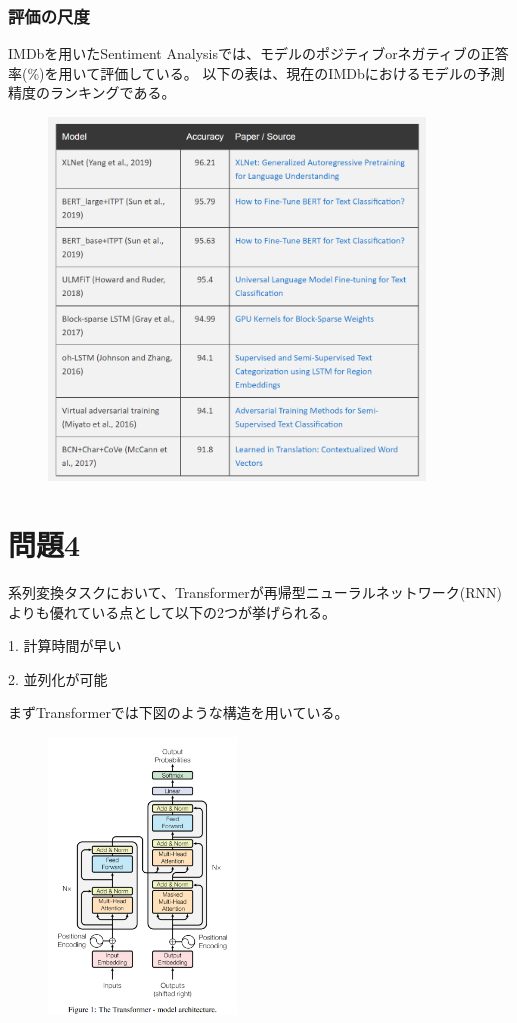 \documentclass[a4j,11pt]{jarticle}
\begin{document}
\subsubsection*{評価の尺度}
IMDbを用いたSentiment Analysisでは、モデルのポジティブorネガティブの正答率(\%)を用いて評価している。
以下の表は、現在のIMDbにおけるモデルの予測精度のランキングである。
\begin{figure}
    \centering
    \includegraphics[width=10cm]{p3-3.png}
\end{figure}

\newpage
\section{問題4}
系列変換タスクにおいて、Transformerが再帰型ニューラルネットワーク(RNN)よりも優れている点として以下の2つが挙げられる。

1. 計算時間が早い

2. 並列化が可能

まずTransformerでは下図のような構造を用いている。

\begin{figure}[hbtp]
    \centering
    \includegraphics[width=5cm]{p4-2.png}
\end{figure}
\end{document}
